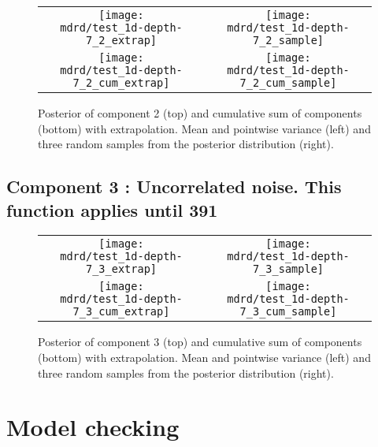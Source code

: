 \documentclass{article} %
\begin{document}


\begin{figure}[H]
\newcommand{\wmgd}{0.5\columnwidth}
\newcommand{\hmgd}{3.0cm}
\newcommand{\mdrd}{test_1d-depth-7}
\newcommand{\mbm}{\hspace{-0.3cm}}
\begin{tabular}{cc}
\mbm \texttt{[image: \\mdrd/test\_1d-depth-7\_2\_extrap]} & \texttt{[image: \\mdrd/test\_1d-depth-7\_2\_sample]} \\
\mbm \texttt{[image: \\mdrd/test\_1d-depth-7\_2\_cum\_extrap]} & \texttt{[image: \\mdrd/test\_1d-depth-7\_2\_cum\_sample]}
\end{tabular}
\caption{Posterior of component 2 (top) and cumulative sum of components (bottom) with extrapolation. Mean and pointwise variance (left) and three random samples from the posterior distribution (right).}
\label{fig:extrap2}
\end{figure}

\subsection{Component 3 : Uncorrelated noise. This function applies until  391}



\begin{figure}[H]
\newcommand{\wmgd}{0.5\columnwidth}
\newcommand{\hmgd}{3.0cm}
\newcommand{\mdrd}{test_1d-depth-7}
\newcommand{\mbm}{\hspace{-0.3cm}}
\begin{tabular}{cc}
\mbm \texttt{[image: \\mdrd/test\_1d-depth-7\_3\_extrap]} & \texttt{[image: \\mdrd/test\_1d-depth-7\_3\_sample]} \\
\mbm \texttt{[image: \\mdrd/test\_1d-depth-7\_3\_cum\_extrap]} & \texttt{[image: \\mdrd/test\_1d-depth-7\_3\_cum\_sample]}
\end{tabular}
\caption{Posterior of component 3 (top) and cumulative sum of components (bottom) with extrapolation. Mean and pointwise variance (left) and three random samples from the posterior distribution (right).}
\label{fig:extrap3}
\end{figure}

\section{Model checking}
\label{sec:check}
\end{document}
